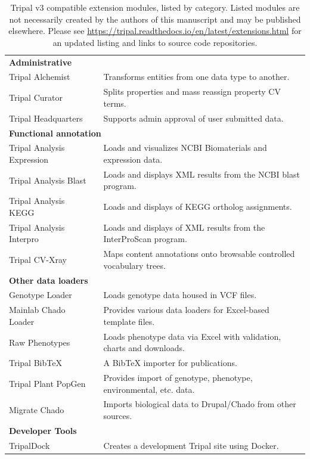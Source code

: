 \begin{table}[!ht]
	\caption{Tripal v3 compatible extension modules, listed by category. Listed modules are not necessarily created by the authors of this manuscript and may be published elsewhere. Please see \url{https://tripal.readthedocs.io/en/latest/extensions.html} for an updated listing and links to source code repositories.
}
	\footnotesize%
	\begin{tabularx}{\linewidth}{ll}
		\multicolumn{2}{l}{\textbf{Administrative}} \\
		Tripal Alchemist  & Transforms entities from one data type to another.  \\
		Tripal Curator  & Splits properties and mass reassign property CV terms.  \\
		Tripal Headquarters  & Supports admin approval of user submitted data.  \\
		\multicolumn{2}{l}{\textbf{Functional annotation }} \\
		Tripal Analysis Expression  & Loads and visualizes NCBI Biomaterials and expression data.  \\
		Tripal Analysis Blast  & Loads and displays XML results from the NCBI blast program.  \\
		Tripal Analysis KEGG  & Loads and displays of KEGG ortholog assignments.  \\
		Tripal Analysis Interpro  & Loads and displays of XML results from the InterProScan program.  \\
		Tripal CV-Xray  & Maps content annotations onto browsable controlled vocabulary trees.  \\
		\multicolumn{2}{l}{\textbf{Other data loaders }} \\
		Genotype Loader  & Loads genotype data housed in VCF files.  \\
		Mainlab Chado Loader  & Provides various data loaders for Excel-based template files.  \\
		Raw Phenotypes  & Loads phenotype data via Excel with validation, charts and downloads.  \\
		Tripal BibTeX  & A BibTeX importer for publications.  \\
		Tripal Plant PopGen  & Provides import of genotype, phenotype, environmental, etc. data.  \\
		Migrate Chado  & Imports biological data to Drupal/Chado from other sources.  \\
		\multicolumn{2}{l}{\textbf{Developer Tools }} \\
		TripalDock  & Creates a development Tripal site using Docker.  \\

\end{tabularx}
\end{table}
